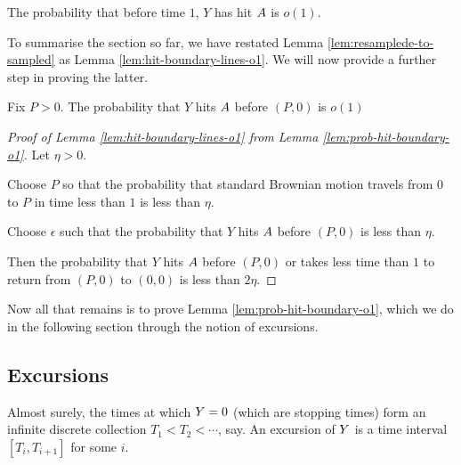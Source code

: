 {\begin{lemma}
  \label{lem:hit-boundary-lines-o1}
  The probability that before time $1$, $Y$ has hit $A$
  is $o(1)$.
\end{lemma}

To summarise the section so far, we have restated Lemma
\ref{lem:resamplede-to-sampled}
as Lemma
\ref{lem:hit-boundary-lines-o1}.  We will now provide a further step
in proving the latter.

\newcommand{\farpoint}{(P,0)}
\newcommand{\probhitboundaryis}[1]{Fix $P > 0$.  The probability that $Y$
  hits $\boundarylines$ before $\farpoint$ is #1}

\begin{lemma}
  \label{lem:prob-hit-boundary-o1}
  \probhitboundaryis{$o(1)$}
\end{lemma}

\newcommand{\origin}{(0,0)}

\begin{proof}[Proof of Lemma \ref{lem:hit-boundary-lines-o1} from
    Lemma \ref{lem:prob-hit-boundary-o1}]
  Let $\eta > 0$.

  Choose $P$ so that the probability that standard Brownian motion
  travels from $0$ to $P$ in time less than $1$ is less than
  $\eta$.

  Choose $\epsilon$ such that the probability that $Y$ hits
  $A$ before $\farpoint$ is less than $\eta$.

  Then the probability that $Y$ hits $A$ before $\farpoint$
  or takes less time than $1$ to return from $\farpoint$ to $\origin$ is
  less than $2\eta$.

\end{proof}

Now all that remains is to prove Lemma \ref{lem:prob-hit-boundary-o1},
which we do in the following section through the notion of excursions.

\subsection{Excursions}

\newcommand{\excursionstart}{T}

\begin{definition*}
  Almost surely, the times at which $Y = 0$ (which are stopping
  times) form an infinite discrete collection $\excursionstart_1 <
  \excursionstart_2 < \cdots$, say.  An excursion of $Y$ is a
  time interval $[\excursionstart_i, \excursionstart_{i+1}]$ for some
  $i$.
\end{definition*}

}
